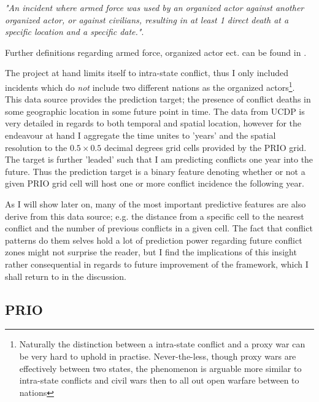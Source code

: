 \documentclass[a4paper]{article}
\begin{document}
\begin{displayquote}

\emph{"An incident where armed force was used by an organized actor against another organized actor, or against civilians, resulting in at least 1 direct death at a specific location and a specific date."}\citep[38]{Croicu_Sundberg_2017}.

\end{displayquote}

Further definitions regarding armed force, organized actor ect. can be found in \cite[10-11]{Croicu_Sundberg_2017}.\par 

The project at hand limits itself to intra-state conflict, thus I only included incidents which do \emph{not} include two different nations as the organized actors\footnote{Naturally the distinction between a intra-state conflict and a proxy war can be very hard to uphold in practise. Never-the-less, though proxy wars are effectively between two states, the phenomenon is arguable more similar to intra-state conflicts and civil wars then to all out open warfare between to nations}. This data source provides the prediction target; the presence of conflict deaths in some geographic location in some future point in time. The data from UCDP is very detailed in regards to both temporal and spatial location, however for the endeavour at hand I aggregate the time unites to 'years' and the spatial resolution to the $0.5\times0.5$ decimal degrees grid cells provided by the PRIO grid. The target is further 'leaded' such that I am predicting conflicts one year into the future. Thus the prediction target is a binary feature denoting whether or not a given PRIO grid cell will host one or more conflict incidence the following year.\par

As I will show later on, many of the most important predictive features are also derive from this data source; e.g. the distance from a specific cell to the nearest conflict and the number of previous conflicts in a given cell. The fact that conflict patterns do them selves hold a lot of prediction power regarding future conflict zones might not surprise the reader, but I find the implications of this insight rather consequential in regards to future improvement of the framework, which I shall return to in the discussion.\par

\subsection{PRIO}
\end{document}
